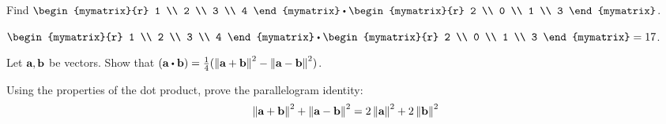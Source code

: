 \begin{ex}
  Find $\begin{mymatrix}{r}
    1 \\
    2 \\
    3 \\
    4
  \end{mymatrix} \dotprod \begin{mymatrix}{r}
    2 \\
    0 \\
    1 \\
    3
  \end{mymatrix}$.
  \begin{sol}
    $\begin{mymatrix}{r}
      1 \\
      2 \\
      3 \\
      4
    \end{mymatrix} \dotprod \begin{mymatrix}{r}
      2 \\
      0 \\
      1 \\
      3
    \end{mymatrix} = 17$.
  \end{sol}
\end{ex}

\begin{ex}
  Let $\vect{a},\vect{b}$ be vectors. Show that
  $(\vect{a}\dotprod \vect{b})
  = \frac{1}{4}(\norm{\vect{a}+\vect{b}}^2
  - \norm{\vect{a}-\vect{b}}^2)$.
\end{ex}

\begin{ex}
  Using the properties of the dot product, prove the parallelogram
  identity:
  \begin{equation*}
    \norm{\vect{a}+\vect{b}}^2+\norm{\vect{a}-\vect{b}}^2
    = 2\norm{\vect{a}}^2+2\norm{\vect{b}}^2
  \end{equation*}
\end{ex}
